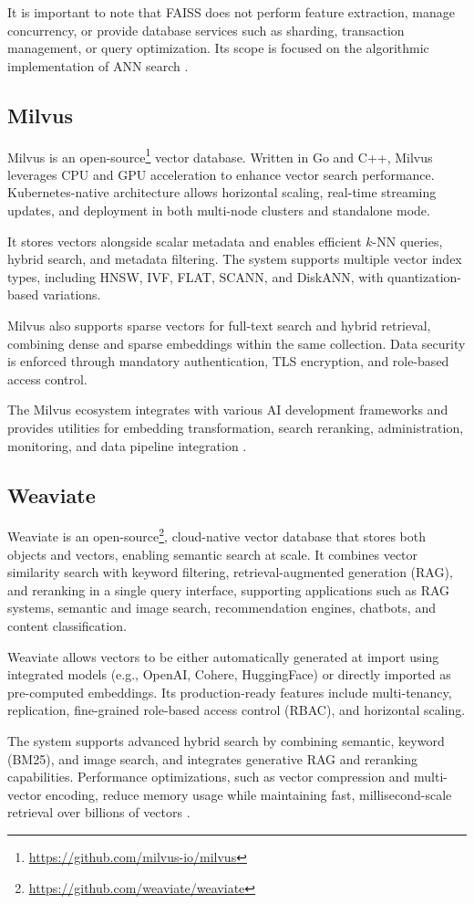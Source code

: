 It is important to note that FAISS does not perform feature extraction, manage concurrency, or provide database services such as sharding, transaction management, or query optimization. Its scope is focused on the algorithmic implementation of ANN search \cite{faiss-2024, faiss-2019}.

\subsection{Milvus}

Milvus is an open-source\footnote{\url{https://github.com/milvus-io/milvus}} vector database. Written in Go and C++, Milvus leverages CPU and GPU acceleration to enhance vector search performance. Kubernetes-native architecture allows horizontal scaling, real-time streaming updates, and deployment in both multi-node clusters and standalone mode.

It stores vectors alongside scalar metadata and enables efficient $k$-NN queries, hybrid search, and metadata filtering. The system supports multiple vector index types, including HNSW, IVF, FLAT, SCANN, and DiskANN, with quantization-based variations.

Milvus also supports sparse vectors for full-text search and hybrid retrieval, combining dense and sparse embeddings within the same collection. Data security is enforced through mandatory authentication, TLS encryption, and role-based access control.

The Milvus ecosystem integrates with various AI development frameworks and provides utilities for embedding transformation, search reranking, administration, monitoring, and data pipeline integration \cite{milvus-2021, milvus-2022}.

\subsection{Weaviate}

Weaviate is an open-source\footnote{\url{https://github.com/weaviate/weaviate}}, cloud-native vector database that stores both objects and vectors, enabling semantic search at scale. It combines vector similarity search with keyword filtering, retrieval-augmented generation (RAG), and reranking in a single query interface, supporting applications such as RAG systems, semantic and image search, recommendation engines, chatbots, and content classification.

Weaviate allows vectors to be either automatically generated at import using integrated models (e.g., OpenAI, Cohere, HuggingFace) or directly imported as pre-computed embeddings. Its production-ready features include multi-tenancy, replication, fine-grained role-based access control (RBAC), and horizontal scaling.

The system supports advanced hybrid search by combining semantic, keyword (BM25), and image search, and integrates generative RAG and reranking capabilities. Performance optimizations, such as vector compression and multi-vector encoding, reduce memory usage while maintaining fast, millisecond-scale retrieval over billions of vectors \cite{weaviate-weaviate}.